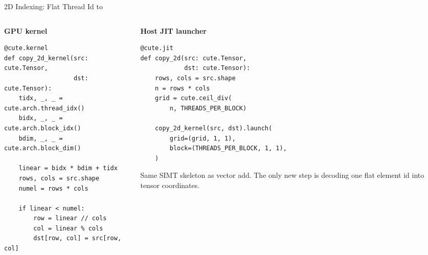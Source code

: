 \documentclass[aspectratio=169,11pt]{beamer}
\newcommand{\code}[1]{\texttt{\detokenize{#1}}}
\begin{document}
\begin{frame}[fragile]{2D Indexing: Flat Thread Id to \code{(row, col)}}
\begin{columns}[T,totalwidth=\textwidth]
  \begin{column}{0.52\textwidth}
    \small\textbf{GPU kernel}
\begin{lstlisting}[style=traceir]
@cute.kernel
def copy_2d_kernel(src: cute.Tensor,
                   dst: cute.Tensor):
    tidx, _, _ = cute.arch.thread_idx()
    bidx, _, _ = cute.arch.block_idx()
    bdim, _, _ = cute.arch.block_dim()

    linear = bidx * bdim + tidx
    rows, cols = src.shape
    numel = rows * cols

    if linear < numel:
        row = linear // cols
        col = linear % cols
        dst[row, col] = src[row, col]
\end{lstlisting}
  \end{column}

  \begin{column}{0.46\textwidth}
    \small\textbf{Host JIT launcher}
\begin{lstlisting}[style=traceir]
@cute.jit
def copy_2d(src: cute.Tensor,
            dst: cute.Tensor):
    rows, cols = src.shape
    n = rows * cols
    grid = cute.ceil_div(
        n, THREADS_PER_BLOCK)

    copy_2d_kernel(src, dst).launch(
        grid=(grid, 1, 1),
        block=(THREADS_PER_BLOCK, 1, 1),
    )
\end{lstlisting}

    \vspace{0.45em}
    \footnotesize\color{TraceNote}
    Same SIMT skeleton as vector add. The only new step is decoding one flat
    element id into tensor coordinates.
  \end{column}
\end{columns}
\end{frame}
\end{document}
